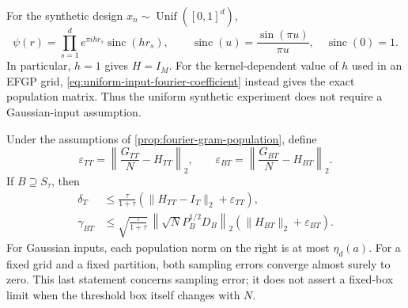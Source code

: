 \begin{remark}
\label{rem:uniform-input-fourier-gram}
For the synthetic design \(x_n\sim\operatorname{Unif}([0,1]^d)\),
\begin{equation}
    \psi(r)
    =\prod_{s=1}^d e^{\pi i h r_s}\operatorname{sinc}(hr_s),
    \qquad
    \operatorname{sinc}(u)=\frac{\sin(\pi u)}{\pi u},
    \quad \operatorname{sinc}(0)=1.
    \label{eq:uniform-input-fourier-coefficient}
\end{equation}
In particular, \(h=1\) gives \(H=I_M\). For the kernel-dependent value of
\(h\) used in an EFGP grid, \cref{eq:uniform-input-fourier-coefficient}
instead gives the exact population matrix. Thus the uniform synthetic
experiment does not require a Gaussian-input assumption.
\end{remark}

\begin{corollary}
\label{cor:input-distribution-active-box}
Under the assumptions of \cref{prop:fourier-gram-population}, define
\begin{equation}
    \varepsilon_{TT}
    =\left\|\frac{G_{TT}}{N}-H_{TT}\right\|_2,
    \qquad
    \varepsilon_{BT}
    =\left\|\frac{G_{BT}}{N}-H_{BT}\right\|_2.
    \label{eq:gram-sampling-errors}
\end{equation}
If \(B\supseteq S_\tau\), then
\begin{align}
    \delta_T
    &\leq
    \frac{\tau}{1+\tau}
    \left(\|H_{TT}-I_T\|_2+\varepsilon_{TT}\right),
    \label{eq:distribution-tail-bound}\\
    \gamma_{BT}
    &\leq
    \sqrt{\frac{\tau}{1+\tau}}\,
    \left\|\sqrt N P_B^{1/2}D_B\right\|_2
    \left(\|H_{BT}\|_2+\varepsilon_{BT}\right).
    \label{eq:distribution-coupling-bound}
\end{align}
For Gaussian inputs, each population norm on the right is at most
\(\eta_d(a)\). For a fixed grid and a fixed partition, both sampling errors
converge almost surely to zero. This last statement concerns sampling error;
it does not assert a fixed-box limit when the threshold box itself changes
with \(N\).
\end{corollary}

